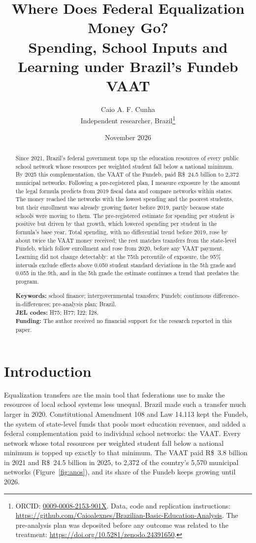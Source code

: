 \documentclass[12pt,letterpaper]{article}
\title{\textbf{Where Does Federal Equalization Money Go?}\\[0.2em]\large Spending, School Inputs and Learning under Brazil's Fundeb VAAT}
\author{Caio A. F. Cunha\\[0.2em]\normalsize Independent researcher, Brazil\thanks{ORCID: \href{https://orcid.org/0009-0008-2153-901X}{0009-0008-2153-901X}. Data, code and replication instructions: \url{https://github.com/Caioalexnes/Brazilian-Basic-Education-Analysis}. The pre-analysis plan was deposited before any outcome was related to the treatment: \url{https://doi.org/10.5281/zenodo.24391650}.}}
\date{November 2026}
\newcommand{\reais}{R\$}
\begin{document}
\maketitle

\begin{abstract}
\singlespacing
\noindent Since 2021, Brazil's federal government tops up the education resources of every public school network whose resources per weighted student fall below a national minimum. By 2025 this complementation, the VAAT of the Fundeb, paid \reais{}~24.5 billion to 2,372 municipal networks. Following a pre-registered plan, I measure exposure by the amount the legal formula predicts from 2019 fiscal data and compare networks within states. The money reached the networks with the lowest spending and the poorest students, but their enrollment was already growing faster before 2019, partly because state schools were moving to them. The pre-registered estimate for spending per student is positive but driven by that growth, which lowered spending per student in the formula's base year. Total spending, with no differential trend before 2019, rose by about twice the VAAT money received; the rest matches transfers from the state-level Fundeb, which follow enrollment and rose from 2020, before any VAAT payment. Learning did not change detectably: at the 75th percentile of exposure, the 95\% intervals exclude effects above 0.050 student standard deviations in the 5th grade and 0.055 in the 9th, and in the 5th grade the estimate continues a trend that predates the program.

\medskip
\noindent\textbf{Keywords:} school finance; intergovernmental transfers; Fundeb; continuous difference-in-differences; pre-analysis plan; Brazil.\\
\noindent\textbf{JEL codes:} H75; H77; I22; I28.\\
\noindent\textbf{Funding:} The author received no financial support for the research reported in this paper.
\end{abstract}

\newpage
\section{Introduction}

Equalization transfers are the main tool that federations use to make the resources of local school systems less unequal. Brazil made such a transfer much larger in 2020. Constitutional Amendment 108 and Law 14.113 kept the Fundeb, the system of state-level funds that pools most education revenues, and added a federal complementation paid to individual school networks: the VAAT. Every network whose total resources per weighted student fall below a national minimum is topped up exactly to that minimum. The VAAT paid \reais{}~3.8 billion in 2021 and \reais{}~24.5 billion in 2025, to 2,372 of the country's 5,570 municipal networks (Figure~\ref{fig:anos}), and its share of the Fundeb keeps growing until 2026.
\end{document}
